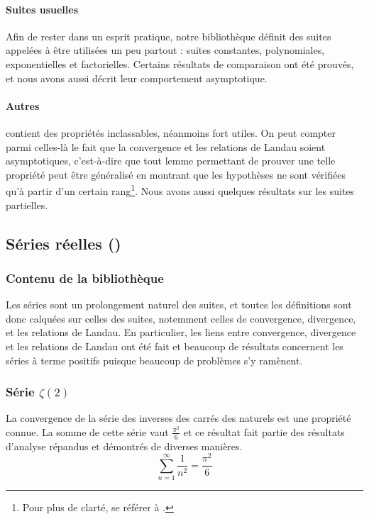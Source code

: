 \paragraph{Suites usuelles} Afin de rester dans un esprit pratique, notre bibliothèque définit des suites appelées à être utilisées un peu partout : suites constantes, polynomiales, exponentielles et factorielles. Certains résultats de comparaison ont été prouvés, et nous avons aussi décrit leur comportement asymptotique.

\paragraph{Autres}  contient des propriétés inclassables, néanmoins fort utiles. On peut compter parmi celles-là le fait que la convergence et les relations de Landau soient asymptotiques, c'est-à-dire que tout lemme permettant de prouver une telle propriété peut être généralisé en montrant que les hypothèses ne sont vérifiées qu'à partir d'un certain rang\footnote{Pour plus de clarté, se référer à .}. Nous avons aussi quelques résultats sur les suites partielles.

\subsection{Séries réelles ()}

\subsubsection{Contenu de la bibliothèque}

Les séries sont un prolongement naturel des suites, et toutes les définitions sont donc calquées sur celles des suites, notemment celles de convergence, divergence, et les relations de Landau.
En particulier, les liens entre convergence, divergence et les relations de Landau ont été fait et beaucoup de résultats concernent les séries à terme positifs puisque beaucoup de problèmes s'y ramènent.

\subsubsection{Série $\zeta(2)$}

La convergence de la série des inverses des carrés des naturels est une propriété connue. La somme de cette série vaut $\frac{\pi^2}6$ et ce résultat fait partie des résultats d'analyse répandus et démontrés de diverses manières.
\[\sum_{n=1}^{\infty}{\frac1{n^2}} = \frac{\pi^2}6\]

